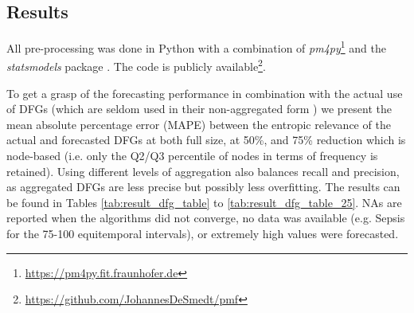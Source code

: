 
\subsection{Results}\label{sec:4.3:results}
All pre-processing was done in Python with a combination of \emph{pm4py}\footnote{\url{https://pm4py.fit.fraunhofer.de}} and the \emph{statsmodels} package \cite{seabold2010statsmodels}. 
The code is publicly available\footnote{\url{https://github.com/JohannesDeSmedt/pmf}}.

To get a grasp of the forecasting performance in combination with the actual use of DFGs (which are seldom used in their non-aggregated form \cite{van2019practitioner}) we present the mean absolute percentage error (MAPE) between the entropic relevance of the actual and forecasted DFGs at both full size, at 50\%, and 75\% reduction which is node-based (i.e. only the Q2/Q3 percentile of nodes in terms of frequency is retained).
Using different levels of aggregation also balances recall and precision, as aggregated DFGs are less precise but possibly less overfitting.
The results can be found in Tables \ref{tab:result_dfg_table} to \ref{tab:result_dfg_table_25}.
NAs are reported when the algorithms did not converge, no data was available (e.g. Sepsis for the 75-100 equitemporal intervals), or extremely high values were forecasted.

